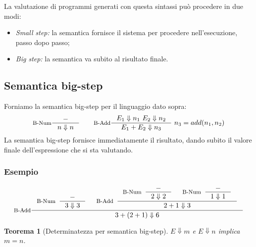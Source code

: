 \documentclass[a4paper, 11pt]{article}
\newtheorem{thm}{Teorema}[section]
\begin{document}
	La valutazione di programmi generati con questa sintassi può procedere in due modi:
	\begin{itemize}
		\item \textit{Small step:} la semantica fornisce il sistema per procedere nell'esecuzione, passo dopo passo;
		\item \textit{Big step:} la semantica va subito al risultato finale.
	\end{itemize}

	\subsection{Semantica big-step}
	Forniamo la semantica big-step per il linguaggio dato sopra:
	\begin{align*}
		\inference[B-Num]{-}{n \Downarrow n} \qquad \inference[B-Add]{E_1 \Downarrow n_1\ E_2 \Downarrow n_2}{E_1 + E_2 \Downarrow n_3}\ n_3 = add(n_1, n_2)
	\end{align*}
	La semantica big-step fornisce immediatamente il risultato, dando subito il valore finale dell'espressione che si sta valutando.
	\subsubsection{Esempio}
	\begin{align*}
		\inference[B-Add]{\inference[B-Num]{-}{3 \Downarrow 3} & \inference[B-Add]{\inference[B-Num]{-}{2 \Downarrow 2} & \inference[B-Num]{-}{1 \Downarrow 1}} {2 + 1 \Downarrow 3}}{3 + (2 + 1) \Downarrow 6}
	\end{align*}
	
	\begin{thm}[Determinatezza per semantica big-step] $E \Downarrow m$ e $E \Downarrow n$ implica $m=n$.
		
	\end{thm}
	
\end{document}
